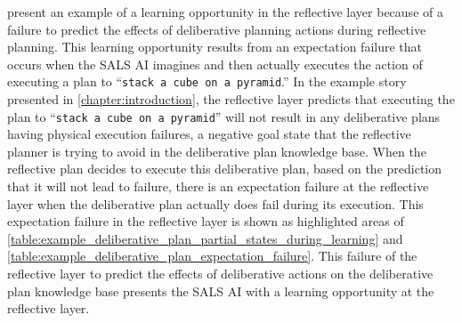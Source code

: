 present an example of a learning opportunity in the reflective layer
because of a failure to predict the effects of deliberative planning
actions during reflective planning.  This learning opportunity results
from an expectation failure that occurs when the SALS AI imagines and
then actually executes the action of executing a plan to ``{\tt{stack
    a cube on a pyramid}}.''  In the example story presented in
{\mbox{\autoref{chapter:introduction}}}, the reflective layer predicts
that executing the plan to ``{\tt{stack a cube on a pyramid}}'' will
not result in any deliberative plans having physical execution
failures, a negative goal state that the reflective planner is trying
to avoid in the deliberative plan knowledge base.  When the reflective
plan decides to execute this deliberative plan, based on the
prediction that it will not lead to failure, there is an expectation
failure at the reflective layer when the deliberative plan actually
does fail during its execution.  This expectation failure in the
reflective layer is shown as highlighted areas of
{\mbox{\autoref{table:example_deliberative_plan_partial_states_during_learning}}}
and
{\mbox{\autoref{table:example_deliberative_plan_expectation_failure}}}.
This failure of the reflective layer to predict the effects of
deliberative actions on the deliberative plan knowledge base presents
the SALS AI with a learning opportunity at the reflective layer.

